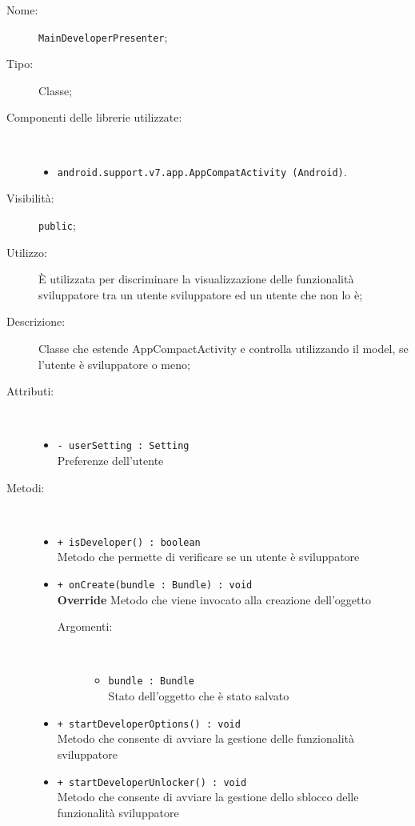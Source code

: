\documentclass[../DefinizioneDiProdotto.tex]{subfiles}
\begin{document}
\begin{description}
	\item[Nome:] \texttt{MainDeveloperPresenter};
	\item[Tipo:] Classe;
	\item[Componenti delle librerie utilizzate:] \
	\begin{itemize}
		\item \texttt{android.support.v7.app.AppCompatActivity (Android)}.
		
	\end{itemize}
	\item[Visibilità:] \texttt{public};
	\item[Utilizzo:] È utilizzata per discriminare la visualizzazione delle funzionalità sviluppatore tra un utente sviluppatore ed un utente che non lo è;
	\item[Descrizione:] Classe che estende AppCompactActivity e controlla utilizzando il model, se l'utente è sviluppatore o meno;
	\item[Attributi:] \
	\begin{itemize}
		\item \texttt{- userSetting : Setting}\\
		Preferenze dell'utente
		
	\end{itemize}
	\item[Metodi:] \
	\begin{itemize}
		\item \texttt{+ isDeveloper() : boolean}\\
		Metodo che permette di verificare se un utente è sviluppatore
		\item \texttt{+ onCreate(bundle : Bundle) : void}\\
		\textbf{Override} Metodo che viene invocato alla creazione dell'oggetto
		\begin{description}
			\item[Argomenti:] \
			\begin{itemize}
				\item \texttt{bundle : Bundle}\\
				Stato dell'oggetto che è stato salvato\end{itemize}
		\end{description}
		\item \texttt{+ startDeveloperOptions() : void}\\
		Metodo che consente di avviare la gestione delle funzionalità sviluppatore
		\item \texttt{+ startDeveloperUnlocker() : void}\\
		Metodo che consente di avviare la gestione dello sblocco delle funzionalità sviluppatore
	\end{itemize}
\end{description}
\end{document}
